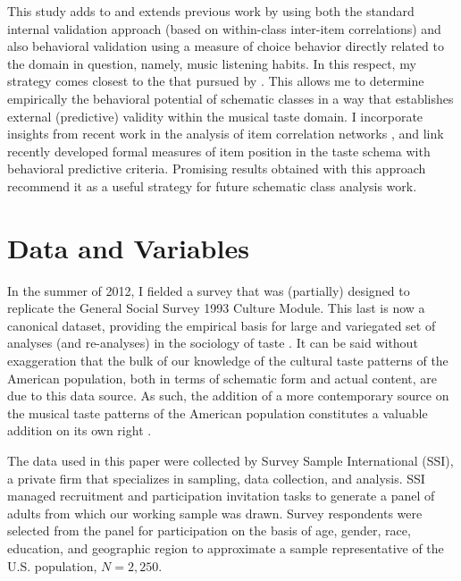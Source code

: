 \documentclass[preprint, authoryear,11pt, 3p]{elsarticle}
\begin{document}
This study adds to and extends previous work by using both the standard internal validation approach (based on within-class inter-item correlations) and also behavioral validation using a measure of choice behavior directly related to the domain in question, namely, music listening habits. In this respect, my strategy comes closest to the that pursued by \citet{baldassarri2014neither}. This allows me to determine empirically the behavioral potential of schematic classes in a way that establishes external (predictive) validity within the musical taste domain. I incorporate insights from recent work in the analysis of item correlation networks \citep{epskamp2012qgraph}, and link recently developed formal measures of item position in the taste schema with behavioral predictive criteria. Promising results obtained with this approach recommend it as a useful strategy for future schematic class analysis work. 

\section{Data and Variables}
In the summer of 2012, I fielded a survey that was (partially) designed to replicate the General Social Survey 1993 Culture Module. This last is now a canonical dataset, providing the empirical basis for large and variegated set of analyses (and re-analyses) in the sociology of taste \citep[][among others]{boutyline2017improving, bryson1996anything,bryson1997univores, goldberg2011mapping, han2003unraveling, okada2017structure, tampubolon2008revisiting}. It can be said without exaggeration that the bulk of our knowledge of the cultural taste patterns of the American population, both in terms of schematic form and actual content, are due to this data source. As such, the addition of a more contemporary source on the musical taste patterns of the American population constitutes a valuable addition on its own right \citep{lizardo2016cultural, lizardo2016end, lizardo2015musical}.

The data used in this paper were collected by Survey Sample International (SSI), a private firm that specializes in sampling, data collection, and analysis. SSI managed recruitment and participation invitation tasks to generate a panel of adults from which our working sample was drawn. Survey respondents were selected from the panel for participation on the basis of age, gender, race, education, and geographic region to approximate a sample representative of the U.S. population, $N = 2,250$.
\end{document}
